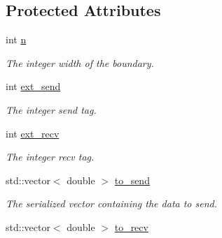 \subsection*{Protected Attributes}
\begin{DoxyCompactItemize}
\item 
\hypertarget{classone__d_1_1link__boundary_a942871611e7e2df2dd53d78316dd07da}{int \hyperlink{classone__d_1_1link__boundary_a942871611e7e2df2dd53d78316dd07da}{n}}\label{classone__d_1_1link__boundary_a942871611e7e2df2dd53d78316dd07da}

\begin{DoxyCompactList}\small\item\em The integer width of the boundary. \end{DoxyCompactList}\item 
\hypertarget{classone__d_1_1link__boundary_ae13b8e7a3ad6ff7cdd3afba5a8b88a66}{int \hyperlink{classone__d_1_1link__boundary_ae13b8e7a3ad6ff7cdd3afba5a8b88a66}{ext\-\_\-send}}\label{classone__d_1_1link__boundary_ae13b8e7a3ad6ff7cdd3afba5a8b88a66}

\begin{DoxyCompactList}\small\item\em The integer send tag. \end{DoxyCompactList}\item 
\hypertarget{classone__d_1_1link__boundary_a931a7862ab3af0dee5c400d9798bbcba}{int \hyperlink{classone__d_1_1link__boundary_a931a7862ab3af0dee5c400d9798bbcba}{ext\-\_\-recv}}\label{classone__d_1_1link__boundary_a931a7862ab3af0dee5c400d9798bbcba}

\begin{DoxyCompactList}\small\item\em The integer recv tag. \end{DoxyCompactList}\item 
\hypertarget{classone__d_1_1link__boundary_a05e6721eb5c42298bbc61dc1f67887c4}{std\-::vector$<$ double $>$ \hyperlink{classone__d_1_1link__boundary_a05e6721eb5c42298bbc61dc1f67887c4}{to\-\_\-send}}\label{classone__d_1_1link__boundary_a05e6721eb5c42298bbc61dc1f67887c4}

\begin{DoxyCompactList}\small\item\em The serialized vector containing the data to send. \end{DoxyCompactList}\item 
\hypertarget{classone__d_1_1link__boundary_a482444b130bdc86937ab75efafa12e21}{std\-::vector$<$ double $>$ \hyperlink{classone__d_1_1link__boundary_a482444b130bdc86937ab75efafa12e21}{to\-\_\-recv}}\label{classone__d_1_1link__boundary_a482444b130bdc86937ab75efafa12e21}


\end{DoxyCompactItemize}
